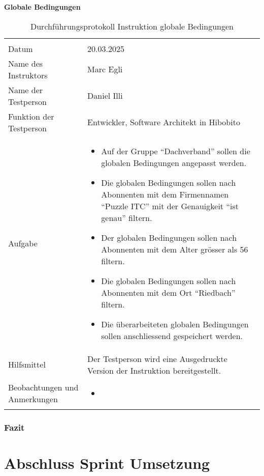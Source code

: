 \textbf{Globale Bedingungen}
\begin{table}[h!]
   \begin{tabular}{|L{0.4\textwidth}|L{0.6\textwidth}|}
       \hline
        \\
       Datum & 20.03.2025 \\
       \hline
       Name des Instruktors & Marc Egli \\
       \hline
       Name der Testperson & Daniel Illi \\
       \hline
       Funktion der Testperson & Entwickler, Software Architekt in Hibobito \\
       \hline
       Aufgabe & 
       \begin{itemize}
         \item Auf der Gruppe ``Dachverband'' sollen die globalen Bedingungen angepasst werden.
         \item Die globalen Bedingungen sollen nach Abonnenten mit dem Firmennamen ``Puzzle ITC'' mit der Genauigkeit ``ist genau'' filtern.
         \item Der globalen Bedingungen sollen nach Abonnenten mit dem Alter grösser als 56 filtern.
         \item Die globalen Bedingungen sollen nach Abonnenten mit dem Ort ``Riedbach'' filtern.
         \item Die überarbeiteten globalen Bedingungen sollen anschliessend gespeichert werden.
       \end{itemize} \\
       \hline
       Hilfsmittel & Der Testperson wird eine Ausgedruckte Version der Instruktion bereitgestellt. \\
       \hline
       Beobachtungen und Anmerkungen & 
       \begin{itemize}
         \item 
       \end{itemize}   \\
       \hline
     \end{tabular}
     \caption{Durchführungsprotokoll Instruktion globale Bedingungen}
\end{table}

\subsection{Fazit}

\chapter{Abschluss Sprint Umsetzung}

